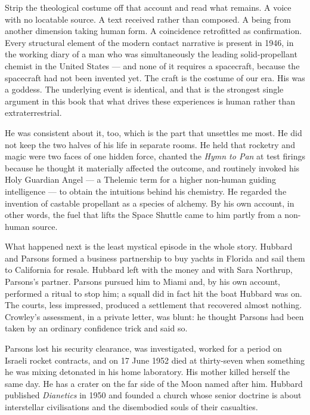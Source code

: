Strip the theological costume off that account and read what remains. A voice with no locatable
source. A text received rather than composed. A being from another dimension taking human form.
A coincidence retrofitted as confirmation. Every structural element of the modern contact
narrative is present in 1946, in the working diary of a man who was simultaneously the leading
solid-propellant chemist in the United States --- and none of it requires a spacecraft, because
the spacecraft had not been invented yet. The craft is the costume of our era. His was a goddess.
The underlying event is identical, and that is the strongest single argument in this book that
what drives these experiences is human rather than extraterrestrial.

He was consistent about it, too, which is the part that unsettles me most. He did not keep the
two halves of his life in separate rooms. He held that rocketry and magic were two faces of one
hidden force, chanted the \emph{Hymn to Pan} at test firings because he thought it materially
affected the outcome, and routinely invoked his Holy Guardian Angel --- a Thelemic term for a
higher non-human guiding intelligence --- to obtain the intuitions behind his chemistry. He
regarded the invention of castable propellant as a species of alchemy. By his own account, in
other words, the fuel that lifts the Space Shuttle came to him partly from a non-human source.

What happened next is the least mystical episode in the whole story. Hubbard and Parsons formed
a business partnership to buy yachts in Florida and sail them to California for resale. Hubbard
left with the money and with Sara Northrup, Parsons's partner. Parsons pursued him to Miami and,
by his own account, performed a ritual to stop him; a squall did in fact hit the boat Hubbard was
on. The courts, less impressed, produced a settlement that recovered almost nothing. Crowley's
assessment, in a private letter, was blunt: he thought Parsons had been taken by an ordinary
confidence trick and said so.

Parsons lost his security clearance, was investigated, worked for a period on Israeli rocket
contracts, and on 17 June 1952 died at thirty-seven when something he was mixing detonated in
his home laboratory. His mother killed herself the same day. He has a crater on the far side of
the Moon named after him. Hubbard published \emph{Dianetics} in 1950 and founded a church whose
senior doctrine is about interstellar civilisations and the disembodied souls of their casualties.

